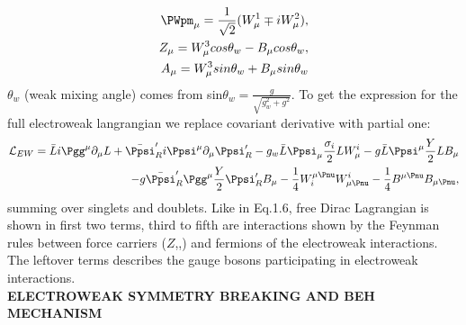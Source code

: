 \begin{equation}
    \begin{aligned}
    \PWpm_\mu = \frac{1}{\sqrt{2}}(W^1_\mu \mp iW^2_\mu),\\
    Z_\mu = W^3_\mu cos\theta_w - B_\mu cos \theta_w,\\
    A_\mu = W^3_\mu sin \theta_w + B_\mu sin \theta_w
    \end{aligned}
\end{equation}
$\theta_w$ (weak mixing angle) comes from sin$\theta_w=\frac{g}{\sqrt{g_w^2+g^2}}$. To get the expression for the full electroweak langrangian we replace covariant derivative with partial one:
\begin{equation}
\begin{aligned}
    \mathcal{L}_{EW}=\bar{L}i\Pgg^\mu\partial_\mu L + \bar{\Ppsi}^\prime_R i \Ppsi^\mu \partial_\mu \Ppsi^\prime_R - g_w\bar{L}\Ppsi_\mu\frac{\sigma_i}{2}LW^i_\mu - g\bar{L}\Ppsi^\mu\frac{Y}{2}LB_\mu \\- g \bar{\Ppsi}^\prime_R\Pgg^\mu\frac{Y}{2}\Ppsi^\prime_R B_\mu - \frac{1}{4} W_i^{\mu\Pnu}W^i_{\mu\Pnu} - \frac{1}{4} B^{\mu\Pnu} B_{\mu\Pnu},
\end{aligned}
\end{equation}
summing over singlets and doublets. Like in Eq.1.6, free Dirac Lagrangian is shown in first two  terms, third to fifth are interactions shown by the Feynman rules between force carriers ($Z$,\PWpm,\Pgg) and fermions of the electroweak interactions. The leftover terms describes the gauge bosons participating in electroweak interactions. \\

\textbf{ELECTROWEAK SYMMETRY BREAKING AND BEH MECHANISM}\\

